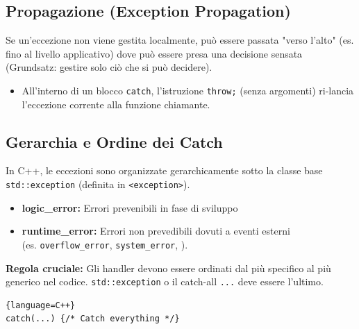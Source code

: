 \vspace{-1em}

\subsection{Propagazione (Exception Propagation)}
Se un'eccezione non viene gestita localmente, può essere passata "verso l'alto" (es. fino al livello applicativo) dove può essere presa una decisione sensata (Grundsatz: gestire solo ciò che si può decidere).
\begin{itemize}
    \item All'interno di un blocco \texttt{catch}, l'istruzione \texttt{throw;} (senza argomenti) ri-lancia l'eccezione corrente alla funzione chiamante.
\end{itemize}

\subsection{Gerarchia e Ordine dei Catch}
In C++, le eccezioni sono organizzate gerarchicamente sotto la classe base \texttt{std::exception} (definita in \texttt{<exception>}).

\begin{itemize}
    \item \textbf{logic\_error: } Errori prevenibili in fase di sviluppo
    \item \textbf{runtime\_error:} Errori non prevedibili dovuti a eventi esterni\\
    (es. \texttt{overflow\_error}, \texttt{system\_error}, ).
\end{itemize}

\medbreak

\textbf{\color{orange}Regola cruciale:} Gli handler devono essere ordinati dal più specifico al più 
generico nel codice. \texttt{std::exception} o il catch-all \texttt{...} deve essere l'ultimo.

\begin{lstlisting}{language=C++}
catch(...) {/* Catch everything */}
\end{lstlisting}

\resizebox{\columnwidth}{!}{

}

\example{}
\vspace{-1em}

